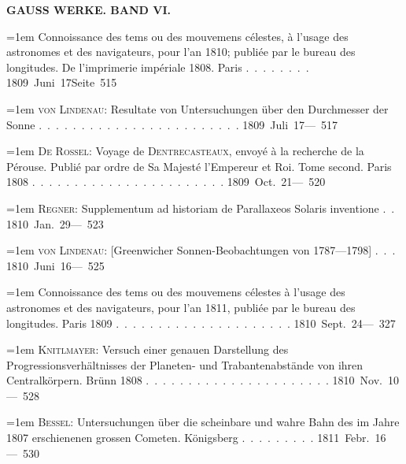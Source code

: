 \clearpage
{}
\noindent{}%
\parbox[b]{\dimexpr\textwidth-20mm\relax}{\centering\small\textbf{GAUSS WERKE. BAND VI.}}%
\makebox[10mm][r]{}\par\nobreak\medskip
\begingroup
\raggedright
\noindent\hangindent=1em Connoissance des tems ou des mouvemens célestes, à l'usage des astronomes et des navigateurs, pour l'an 1810; publiée par le bureau des longitudes. De l'imprimerie impériale 1808. Paris \mbox{.\ .\ .\ .\ .\ .\ .\ .} \hfill\mbox{1809 Juni 17}\quad\mbox{Seite 515}\par\smallskip
\noindent\hangindent=1em \textsc{von Lindenau}: Resultate von Untersuchungen über den Durchmesser der Sonne \mbox{.\ .\ .\ .\ .\ .\ .\ .\ .\ .\ .\ .\ .\ .\ .\ .\ .\ .\ .\ .\ .\ .\ .\ .} \hfill\mbox{1809 Juli 17}\quad\mbox{--- 517}\par\smallskip
\noindent\hangindent=1em \textsc{De Rossel}: Voyage de \textsc{Dentrecasteaux}, envoyé à la recherche de la Pérouse. Publié par ordre de Sa Majesté l'Empereur et Roi. Tome second. Paris 1808 \mbox{.\ .\ .\ .\ .\ .\ .\ .\ .\ .\ .\ .\ .\ .\ .\ .\ .\ .\ .\ .\ .\ .\ .} \hfill\mbox{1809 Oct. 21}\quad\mbox{--- 520}\par\smallskip
\noindent\hangindent=1em \textsc{Regner}: Supplementum ad historiam de Parallaxeos Solaris inventione \mbox{.\ .} \hfill\mbox{1810 Jan. 29}\quad\mbox{--- 523}\par\smallskip
\noindent\hangindent=1em \textsc{von Lindenau}: [Greenwicher Sonnen-Beobachtungen von 1787---1798] \mbox{.\ .\ .} \hfill\mbox{1810 Juni 16}\quad\mbox{--- 525}\par\smallskip
\noindent\hangindent=1em Connoissance des tems ou des mouvemens célestes à l'usage des astronomes et des navigateurs, pour l'an 1811, publiée par le bureau des longitudes. Paris 1809 \mbox{.\ .\ .\ .\ .\ .\ .\ .\ .\ .\ .\ .\ .\ .\ .\ .\ .\ .\ .\ .\ .} \hfill\mbox{1810 Sept. 24}\quad\mbox{--- 327}\par\smallskip
\noindent\hangindent=1em \textsc{Knitlmayer}: Versuch einer genauen Darstellung des Progressionsverhältnisses der Planeten- und Trabantenabstände von ihren Centralkörpern. Brünn 1808 \mbox{.\ .\ .\ .\ .\ .\ .\ .\ .\ .\ .\ .\ .\ .\ .\ .\ .\ .\ .\ .\ .\ .} \hfill\mbox{1810 Nov. 10}\quad\mbox{--- 528}\par\smallskip
\noindent\hangindent=1em \textsc{Bessel}: Untersuchungen über die scheinbare und wahre Bahn des im Jahre 1807 erschienenen grossen Cometen. Königsberg \mbox{.\ .\ .\ .\ .\ .\ .\ .\ .} \hfill\mbox{1811 Febr. 16}\quad\mbox{--- 530}\par\smallskip
